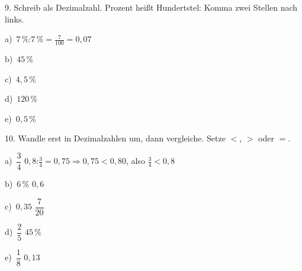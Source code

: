 \documentclass[11pt]{article}
\newcommand{\grau}[1]{{\color{mbgrau}#1}}
\begin{document}
\begin{pfaufg}{}{9.}{}
Schreib als Dezimalzahl. Prozent heißt Hundertstel: Komma zwei Stellen nach links.\par\smallskip
\grau{a)\ $7\,\%$:\quad $7\,\% = \frac{7}{100} = 0{,}07$}\par\medskip
\noindent\begin{minipage}[t]{0.48\linewidth}\raggedright
b)\ $45\,\%$
\end{minipage}\hfill
\begin{minipage}[t]{0.48\linewidth}\raggedright
c)\ $4{,}5\,\%$
\end{minipage}\par\smallskip
\noindent\begin{minipage}[t]{0.48\linewidth}\raggedright
d)\ $120\,\%$
\end{minipage}\hfill
\begin{minipage}[t]{0.48\linewidth}\raggedright
e)\ $0{,}5\,\%$
\end{minipage}\par\smallskip
{}
\end{pfaufg}

\begin{pfaufg}{}{10.}{}
Wandle erst in Dezimalzahlen um, dann vergleiche. Setze $<$, $>$ oder $=$.\par\smallskip
\grau{a)\ $\dfrac{3}{4}$ \fbox{\phantom{$<$}} $0{,}8$:\quad $\frac{3}{4} = 0{,}75$\quad$\Rightarrow$\quad $0{,}75 < 0{,}80$, also $\frac{3}{4} < 0{,}8$}\par\medskip
\noindent\begin{minipage}[t]{0.48\linewidth}\raggedright
b)\ $6\,\%$ \fbox{\phantom{$<$}} $0{,}6$
\end{minipage}\hfill
\begin{minipage}[t]{0.48\linewidth}\raggedright
c)\ $0{,}35$ \fbox{\phantom{$<$}} $\dfrac{7}{20}$
\end{minipage}\par\smallskip
\noindent\begin{minipage}[t]{0.48\linewidth}\raggedright
d)\ $\dfrac{2}{5}$ \fbox{\phantom{$<$}} $45\,\%$
\end{minipage}\hfill
\begin{minipage}[t]{0.48\linewidth}\raggedright
e)\ $\dfrac{1}{8}$ \fbox{\phantom{$<$}} $0{,}13$
\end{minipage}\par\smallskip
{}
\end{pfaufg}
\end{document}

